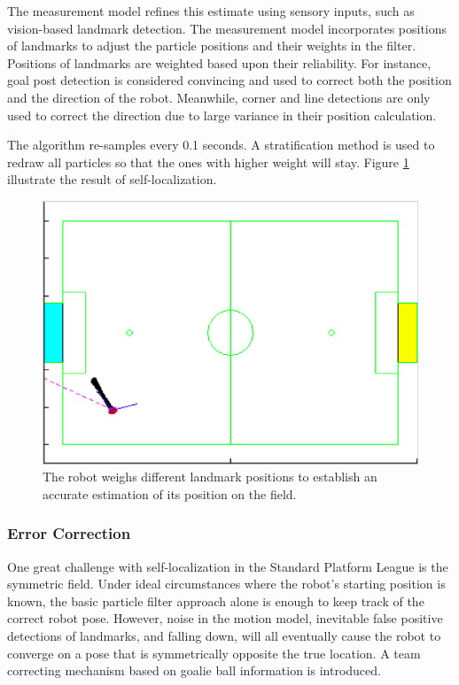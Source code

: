 \documentclass{article}
\begin{document}
	The measurement model refines this estimate using sensory inputs, such as vision-based landmark detection.  The measurement model incorporates positions of landmarks to adjust the particle positions and their weights in the filter. Positions of landmarks are weighted based upon their reliability. For instance, goal post detection is considered convincing and used to correct both the position and the direction of the robot. Meanwhile, corner and line detections are only used to correct the direction due to large variance in their position calculation.

	The algorithm re-samples every 0.1 seconds. A stratification method is used to redraw all  particles so that the ones with higher weight will stay. Figure \ref{fig:particlesafter} illustrate the result of self-localization.

	\begin{figure}[H]
		\centering
		\includegraphics[width=.6\textwidth]{figures/FocusedParticles.eps}
	  	\caption{The robot weighs different landmark positions to establish an accurate estimation of its position on the field.}
		\label{fig:particlesafter}
  	\end{figure}

\subsubsection{Error Correction}
	One great challenge with self-localization in the Standard Platform League is the symmetric field. Under ideal circumstances where the robot's starting position is known, the basic particle filter approach alone is enough to keep track of the correct robot pose. However, noise in the motion model, inevitable false positive detections of landmarks, and falling down, will all eventually cause the robot to converge on a pose that is symmetrically opposite the true location. A team correcting mechanism based on goalie ball information is introduced.
\end{document}
